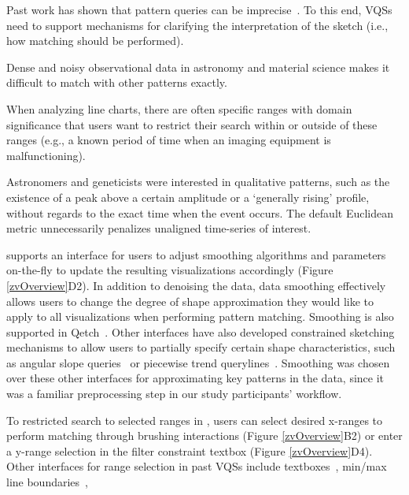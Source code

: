 {  
   Past work has shown that pattern queries can be imprecise~\cite{correll2016semantics,Holz2009,Eichmann2015}. To this end, VQSs need to support mechanisms for clarifying the interpretation of the sketch (i.e., how matching should be performed).
  \problemlist
    \item Dense and noisy observational data in astronomy and material science makes it difficult to match with other patterns exactly.
    \item When analyzing line charts, there are often specific ranges with domain significance that users want to restrict their search within or outside of these ranges (e.g., a known period of time when an imaging equipment is malfunctioning).
    \item Astronomers and geneticists were interested in qualitative patterns, such as the existence of a peak above a certain amplitude or a `generally rising' profile, without regards to the exact time when the event occurs. The default Euclidean metric unnecessarily penalizes unaligned time-series of interest.
  \enumend
  \featurelist
  \item \zvpp supports an interface for users to adjust smoothing algorithms and parameters on-the-fly to update the resulting visualizations accordingly (Figure \ref{zvOverview}D2). In addition to denoising the data, data smoothing effectively allows users to change the degree of shape approximation they would like to apply to all visualizations when performing pattern matching. Smoothing is also supported in Qetch~\cite{Mannino2018}. Other interfaces have also developed constrained sketching mechanisms to allow users to partially specify certain shape characteristics, such as angular slope queries~\cite{Hochheiser2004} or piecewise trend querylines~\cite{ryall2005querylines}. Smoothing was chosen over these other interfaces for approximating key patterns in the data, since it was a familiar preprocessing step in our study participants' workflow.
  \item To restricted search to selected ranges in \zvpp, users can select desired x-ranges to perform matching through brushing interactions (Figure \ref{zvOverview}B2) or enter a y-range selection in the filter constraint textbox (Figure \ref{zvOverview}D4). Other interfaces for range selection in past VQSs
  include textboxes~\cite{wattenberg2001sketching,Mannino2018}, min/max line boundaries~\cite{ryall2005querylines},
}
